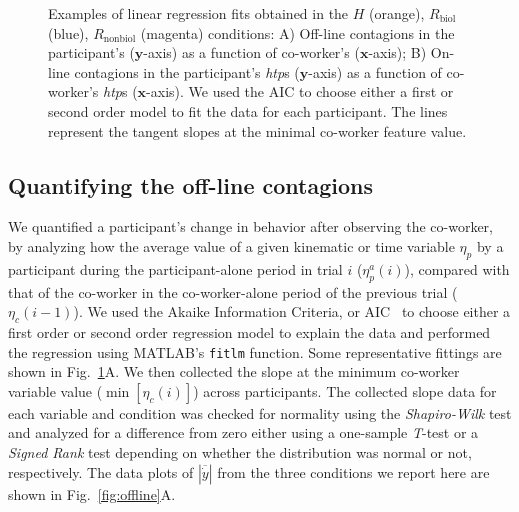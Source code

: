 \begin{figure}[t]
	\caption{Examples of linear regression fits obtained in the $\textit{H}$ (orange), $\textit{R}_{\text{biol}}$ (blue), $\textit{R}_{\text{nonbiol}}$ (magenta) conditions: A) Off-line contagions in the participant's  ($\textbf{y}$-axis) as a function of co-worker's  ($\textbf{x}$-axis); B) On-line contagions in the participant's \textit{htp}s ($\textbf{y}$-axis) as a function of co-worker's \textit{htp}s ($\textbf{x}$-axis). We used the AIC to choose either a first or second order model to fit the data for each participant. The lines represent the tangent slopes at the minimal co-worker feature value.}
	\label{fig:fitting}
\end{figure}



\subsection{Quantifying the off-line contagions}
We quantified a participant's change in behavior after observing the co-worker, by analyzing how the average value of a given kinematic or time variable $\eta_p$ by a participant during the participant-alone period in trial $i$ ($\eta_p^a (i)$), compared with that of the co-worker in the co-worker-alone period of the previous trial ($\eta_c(i-1)$). We used the Akaike Information Criteria, or AIC~\cite{Akaike:ISIT:1973} to choose either a first order or second order regression model to explain the data and performed the regression using MATLAB's {\tt fitlm} function. Some representative fittings are shown in Fig.~\ref{fig:fitting}A. We then collected the slope at the minimum co-worker variable value ($\min[\eta_c(i)]$) across participants. The collected slope data for each variable and condition was checked for normality using the {\it Shapiro-Wilk} test and analyzed for a difference from zero either using a one-sample {\it T}-test or a {\it Signed Rank} test depending on whether the distribution was normal or not, respectively. The data plots of $|\overline{\dot{y}}|$ from the three conditions we report here are shown in Fig.~\ref{fig:offline}A.

